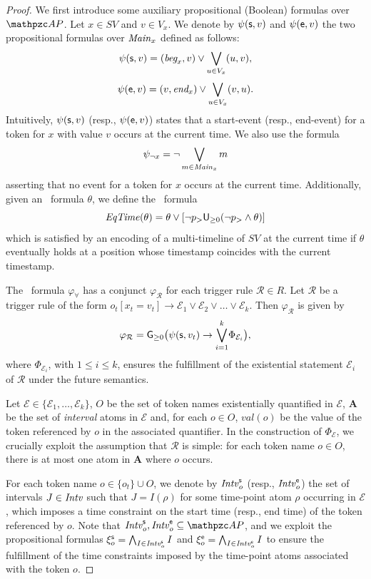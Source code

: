\begin{proof} We first introduce some auxiliary propositional (Boolean) formulas over $\Prop$. Let $x\in SV$ and $v\in V_x$. We denote by
$\psi(\mathsf{s},v)$ and $\psi(\mathsf{e},v)$ the two propositional formulas over ${\mathit{Main}}_x$ defined as follows:%
\[
\psi(\mathsf{s},v)= (\textit{beg}_x,v)\vee \displaystyle{\bigvee_{u\in V_x}}(u,v),
\]
\[
\psi(\mathsf{e},v)= (v,\textit{end}_x)\vee \displaystyle{\bigvee_{u\in V_x}}(v,u).
\]
Intuitively, $\psi(\mathsf{s},v)$ (resp., $\psi(\mathsf{e},v)$) states that a start-event (resp., end-event) for a token for $x$ with value $v$ occurs at the current time.
We also use the formula \[\psi_{\neg x}= \neg \bigvee_{m\in {\mathit{Main}}_x} m\] asserting that no event for a token for $x$ occurs at the current time.
Additionally, given an \MTL\ formula $\theta$, we define the \MTL\ formula \[{\mathit{EqTime}}(\theta) = \theta \vee [\neg p_> \textsf{U}_{\geq 0}(\neg p_> \wedge \theta)]\] which is satisfied
by an encoding of a multi-timeline of $SV$ at the current time if $\theta$ eventually holds at a position whose timestamp coincides with the current timestamp.

The \MTL\ formula $\varphi_{\forall}$ has a conjunct   
 $\varphi_{\mathcal{R}}$ for each trigger rule $\mathcal{R}\in R$. 
 Let $\mathcal{R}$ be a trigger rule of the form
 $o_t[x_t =v_t] \to \mathcal{E}_1\vee \mathcal{E}_2\vee \ldots \vee \mathcal{E}_k$. %
 Then $\varphi_{\mathcal{R}}$ is given by 
 \[
\varphi_{\mathcal{R}}= \textsf{G}_{\geq 0} \big(\psi(\mathsf{s},v_t) \rightarrow \displaystyle{\bigvee_{i=1}^{k}}\Phi_{\mathcal{E}_i}\big),
 \]
where $\Phi_{\mathcal{E}_i}$, with $1\leq i\leq k$, ensures the fulfillment of the existential statement $\mathcal{E}_i$
of $\mathcal{R}$ under the future semantics. 

Let $\mathcal{E}\in \{\mathcal{E}_1,\ldots,\mathcal{E}_k\}$, $O$ be the set of token names existentially quantified
in $\mathcal{E}$, $\mathbf{A}$ be  the set of \emph{interval} atoms in $\mathcal{E}$ and, for each $o\in O$, $val(o)$  be the value of the token referenced by $o$ in the associated quantifier. 
%
In the construction of $\Phi_{\mathcal{E}}$, we crucially exploit the assumption that  $\mathcal{R}$ is simple: %
for each token name $o\in O$, there is at most one atom in $\mathbf{A}$ where $o$ occurs.

For each token name $o\in \{o_t\}\cup O$, %
we denote by ${\mathit{Intv}}_o^{\mathsf{s}}$ (resp., ${\mathit{Intv}}_o^{\mathsf{e}}$) the set of intervals $J\in{\mathit{Intv}}$ such that $J=I(\rho)$ for some time-point atom $\rho$ occurring in  $\mathcal{E}$, which imposes a time constraint on the start time (resp., end time) of the token referenced by $o$. Note that $\Intv_o^{\start},\Intv_o^{\Ending}\subseteq \Prop$, and we exploit the propositional formulas $\xi^{\mathsf{s}}_o = \bigwedge_{I\in {\mathit{Intv}}^{\mathsf{s}}_o}I$ and $\xi^{\mathsf{e}}_o = \bigwedge_{I\in {\mathit{Intv}}^{\mathsf{e}}_o}I$  to ensure the fulfillment of the time constraints imposed by the
time-point atoms associated with the token $o$.  


\end{proof}
